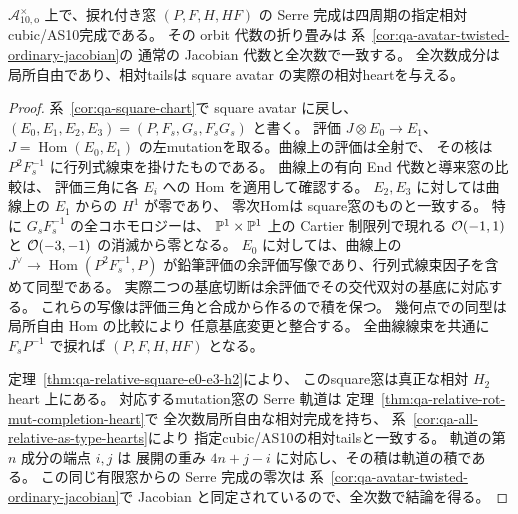 \begin{corollary}[奇数対角開での相対AS完成とJacobian]
\label{cor:qa-avatar-odd-as-jacobian}
$\mathcal A_{10,\mathrm o}^{\times}$ 上で、捩れ付き窓
$(P,F,H,HF)$ の Serre 完成は四周期の指定相対cubic/AS10完成である。
その orbit 代数の折り畳みは
系~\ref{cor:qa-avatar-twisted-ordinary-jacobian}の
通常の Jacobian 代数と全次数で一致する。
全次数成分は局所自由であり、相対tailsは
square avatar の実際の相対heartを与える。
\end{corollary}
\begin{proof}
系~\ref{cor:qa-square-chart}で square avatar に戻し、
$(E_0,E_1,E_2,E_3)=(P,F_s,G_s,F_sG_s)$ と書く。
評価 $J\otimes E_0\to E_1$、$J=\operatorname{Hom}(E_0,E_1)$
の左mutationを取る。曲線上の評価は全射で、
その核は $P^2F_s^{-1}$ に行列式線束を掛けたものである。
曲線上の有向 End 代数と導来窓の比較は、
評価三角に各 $E_i$ への Hom を適用して確認する。
$E_2,E_3$ に対しては曲線上の $E_1$ からの $H^1$ が零であり、
零次Homは square窓のものと一致する。
特に $G_sF_s^{-1}$ の全コホモロジーは、
$\mathbb P^1\times\mathbb P^1$ 上の Cartier 制限列で現れる
$\mathcal O(-1,1)$ と $\mathcal O(-3,-1)$ の消滅から零となる。
$E_0$ に対しては、曲線上の
$J^\vee\to\operatorname{Hom}(P^2F_s^{-1},P)$
が鉛筆評価の余評価写像であり、行列式線束因子を含めて同型である。
実際二つの基底切断は余評価でその交代双対の基底に対応する。
これらの写像は評価三角と合成から作るので積を保つ。
幾何点での同型は局所自由 Hom の比較により
任意基底変更と整合する。
全曲線線束を共通に $F_sP^{-1}$ で捩れば
$(P,F,H,HF)$ となる。

定理~\ref{thm:qa-relative-square-e0-e3-h2}により、
このsquare窓は真正な相対 $H_2$ heart 上にある。
対応するmutation窓の Serre 軌道は
定理~\ref{thm:qa-relative-rot-mut-completion-heart}で
全次数局所自由な相対完成を持ち、
系~\ref{cor:qa-all-relative-as-type-hearts}により
指定cubic/AS10の相対tailsと一致する。
軌道の第 $n$ 成分の端点 $i,j$ は
展開の重み $4n+j-i$ に対応し、その積は軌道の積である。
この同じ有限窓からの Serre 完成の零次は
系~\ref{cor:qa-avatar-twisted-ordinary-jacobian}で
Jacobian と同定されているので、全次数で結論を得る。
\end{proof}

